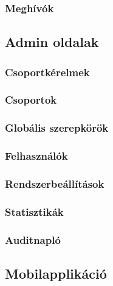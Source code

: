 \subsubsection{Meghívók}

\subsection{Admin oldalak}

\subsubsection{Csoportkérelmek}

\subsubsection{Csoportok}

\subsubsection{Globális szerepkörök}

\subsubsection{Felhasználók}

\subsubsection{Rendszerbeállítások}

\subsubsection{Statisztikák}

\subsubsection{Auditnapló}

\subsection{Mobilapplikáció}

